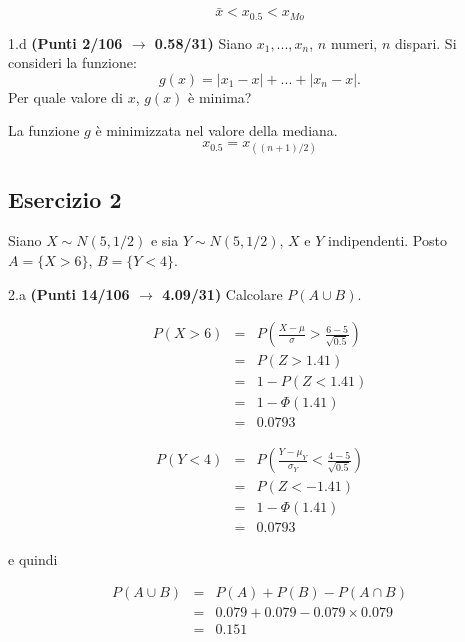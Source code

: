 \documentclass[
  11pt,
]{book}
\theoremstyle{mytheoremstyle}
\theoremstyle{mydefstyle}
\newenvironment{sol}
  {
  \begin{tcolorbox}[enhanced,breakable,arc=0.1mm,boxrule=1pt,colback=white,colframe=iblue,
  title=\bf \fontfamily{lmss}\selectfont \hspace{.5 cm} Soluzione,drop fuzzy shadow]

}{
\end{tcolorbox}
  }
\begin{document}
\begin{sol}
\[\bar x<x_{0.5}<x_{Mo}\]

\end{sol}

1.d \textbf{(Punti 2/106 \(\rightarrow\) 0.58/31)} Siano \(x_1,...,x_n\), \(n\) numeri, \(n\) dispari.
Si consideri la funzione:
\[g(x)=|x_1-x|+...+|x_n-x|.\]
Per quale valore di \(x\), \(g(x)\) è minima?

\begin{sol}
La funzione \(g\) è minimizzata nel valore della mediana.
\[x_{0.5}=x_{((n+1)/2)}\]

\end{sol}

\subsection{Esercizio 2}\label{esercizio-2-17}

Siano \(X\sim N(5,1/2)\) e sia \(Y\sim N(5,1/2)\), \(X\) e \(Y\) indipendenti. Posto \(A=\{X>6\}\), \(B=\{Y<4\}\).

2.a \textbf{(Punti 14/106 \(\rightarrow\) 4.09/31)} Calcolare \(P(A\cup B)\).

\begin{sol}
\begin{eqnarray*}
      P( X   >   6 ) 
        &=& P\left(  \frac { X  -  \mu }{ \sigma }  >  \frac { 6  -  5 }{\sqrt{ 0.5 }} \right)  \\
                 &=& P\left(  Z   >   1.41 \right) \\    &=& 1-P(Z< 1.41 )\\ 
                 &=&  1-\Phi( 1.41 ) \\ &=&  0.0793 
      \end{eqnarray*}

\begin{eqnarray*}
      P( Y   <   4 ) 
        &=& P\left(  \frac { Y  -  \mu_Y }{ \sigma_Y }  <  \frac { 4  -  5 }{\sqrt{ 0.5 }} \right)  \\
                 &=& P\left(  Z   <   -1.41 \right) \\    
                 &=&  1-\Phi( 1.41 ) \\ &=&  0.0793 
      \end{eqnarray*}

e quindi

\begin{eqnarray*}
  P(A\cup B) &=&  P(A)+P(B)-P(A\cap B)\\
  &=& 0.079+0.079-0.079\times0.079\\
  &=& 0.151 
\end{eqnarray*}

\end{sol}
\end{document}
